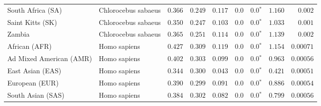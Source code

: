 \begin{center}
\begin{adjustbox}{width = 1\textwidth}
\begin{tabular}{|l|l|r|r|r|r|r|r|r|}
              South Africa (SA) &  Chlorocebus sabaeus &                                        $ 0.366$ &                                           $ 0.249$ &                      $ 0.117$ &            $0.0$ &                  $\bm{0.0{^*}}$ &                                           $ 1.160$ &           $ 0.002$ \\
               Saint Kitts (SK) &  Chlorocebus sabaeus &                                        $ 0.350$ &                                           $ 0.247$ &                      $ 0.103$ &            $0.0$ &                  $\bm{0.0{^*}}$ &                                           $ 1.033$ &           $ 0.001$ \\
                         Zambia &  Chlorocebus sabaeus &                                        $ 0.365$ &                                           $ 0.251$ &                      $ 0.114$ &            $0.0$ &                  $\bm{0.0{^*}}$ &                                           $ 1.139$ &           $ 0.002$ \\
                  African (AFR) &         Homo sapiens &                                        $ 0.427$ &                                           $ 0.309$ &                      $ 0.119$ &            $0.0$ &                  $\bm{0.0{^*}}$ &                                           $ 1.154$ &          $0.00071$ \\
        Ad Mixed American (AMR) &         Homo sapiens &                                        $ 0.402$ &                                           $ 0.303$ &                      $ 0.099$ &            $0.0$ &                  $\bm{0.0{^*}}$ &                                           $ 0.963$ &          $0.00056$ \\
               East Asian (EAS) &         Homo sapiens &                                        $ 0.344$ &                                           $ 0.300$ &                      $ 0.043$ &            $0.0$ &                  $\bm{0.0{^*}}$ &                                           $ 0.421$ &          $0.00051$ \\
                 European (EUR) &         Homo sapiens &                                        $ 0.390$ &                                           $ 0.299$ &                      $ 0.091$ &            $0.0$ &                  $\bm{0.0{^*}}$ &                                           $ 0.886$ &          $0.00054$ \\
              South Asian (SAS) &         Homo sapiens &                                        $ 0.384$ &                                           $ 0.302$ &                      $ 0.082$ &            $0.0$ &                  $\bm{0.0{^*}}$ &                                           $ 0.799$ &          $0.00056$ \\

\end{tabular}
\end{adjustbox}
\end{center}

